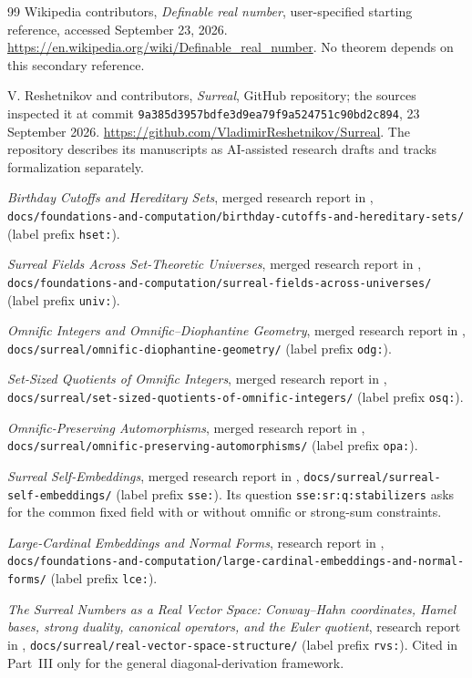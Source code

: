 \documentclass[11pt,a4paper]{article}
\numberwithin{equation}{section}
\theoremstyle{definition}
\theoremstyle{remark}
\newcommand{\repoSHA}{\texttt{9a385d3957bdfe3d9ea79f9a524751c90bd2c894}}
\newcommand{\repopath}[1]{\nolinkurl{#1}}
\begin{document}
\begin{thebibliography}{99}
Wikipedia contributors, \emph{Definable real number},
user-specified starting reference, accessed September 23, 2026.
\url{https://en.wikipedia.org/wiki/Definable_real_number}.
No theorem depends on this secondary reference.

V. Reshetnikov and contributors, \emph{Surreal}, GitHub repository;
the sources inspected it at commit \repoSHA, 23 September 2026.
\url{https://github.com/VladimirReshetnikov/Surreal}.
The repository describes its manuscripts as AI-assisted research drafts and
tracks formalization separately.

\emph{Birthday Cutoffs and Hereditary Sets}, merged research report in
\cite{Repo},
\repopath{docs/foundations-and-computation/birthday-cutoffs-and-hereditary-sets/}
(label prefix \texttt{hset:}).

\emph{Surreal Fields Across Set-Theoretic Universes}, merged research report
in \cite{Repo},
\repopath{docs/foundations-and-computation/surreal-fields-across-universes/}
(label prefix \texttt{univ:}).

\emph{Omnific Integers and Omnific--Diophantine Geometry}, merged research
report in \cite{Repo},
\repopath{docs/surreal/omnific-diophantine-geometry/}
(label prefix \texttt{odg:}).

\emph{Set-Sized Quotients of Omnific Integers}, merged research report in
\cite{Repo},
\repopath{docs/surreal/set-sized-quotients-of-omnific-integers/}
(label prefix \texttt{osq:}).

\emph{Omnific-Preserving Automorphisms}, merged research report in
\cite{Repo},
\repopath{docs/surreal/omnific-preserving-automorphisms/}
(label prefix \texttt{opa:}).


\emph{Surreal Self-Embeddings}, merged research report in \cite{Repo},
\repopath{docs/surreal/surreal-self-embeddings/} (label prefix
\texttt{sse:}). Its question \texttt{sse:sr:q:stabilizers} asks for the
common fixed field with or without omnific or strong-sum constraints.

\emph{Large-Cardinal Embeddings and Normal Forms}, research report in
\cite{Repo},
\repopath{docs/foundations-and-computation/large-cardinal-embeddings-and-normal-forms/}
(label prefix \texttt{lce:}).

\emph{The Surreal Numbers as a Real Vector Space: Conway--Hahn coordinates,
Hamel bases, strong duality, canonical operators, and the Euler quotient},
research report in \cite{Repo},
\repopath{docs/surreal/real-vector-space-structure/} (label prefix
\texttt{rvs:}). Cited in Part~III only for the general diagonal-derivation
framework.


\end{thebibliography}
\end{document}
